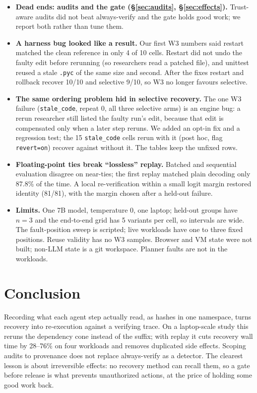 \documentclass[10pt,twocolumn,letterpaper]{article}
\begin{document}
\begin{itemize}
\item \textbf{Dead ends: audits and the gate (\S\ref{sec:audits}, \S\ref{sec:effects}).} Trust-aware audits did not beat always-verify and the gate holds good work; we report both rather than tune them.
\item \textbf{A harness bug looked like a result.} Our first W3 numbers said restart
  matched the clean reference in only 4 of 10 cells. Restart did not undo the faulty
  edit before rerunning (so researchers read a patched file), and unittest reused a
  stale \texttt{.pyc} of the same size and second. After the fixes restart and
  rollback recover 10/10 and selective 9/10, so W3 no longer favours selective.
\item \textbf{The same ordering problem hid in selective recovery.} The one W3
  failure (\texttt{stale\_code}, repeat 0, all three selective arms) is an engine
  bug: a rerun researcher still listed the faulty run's edit, because that edit is
  compensated only when a later step reruns. We added an opt-in fix and a regression
  test; the 15 \texttt{stale\_code} cells rerun with it (post hoc, flag
  \texttt{revert=on}) recover \vthreeStaleAfter{} against \vthreeStaleBefore{}
  without it. The tables keep the unfixed rows.
\item \textbf{Floating-point ties break ``lossless'' replay.} Batched and sequential
  evaluation disagree on near-ties; the first replay matched plain decoding only
  87.8\% of the time. A local re-verification within a small logit margin
  restored identity (81/81), with the margin chosen after a held-out failure.
\item \textbf{Limits.} One 7B model, temperature 0, one laptop; held-out groups have
  $n{=}3$ and the end-to-end grid has 5 variants per cell, so intervals are wide.
  The fault-position sweep is scripted; live workloads have one to three fixed
  positions. Reuse validity has no W3 samples. Browser and VM state were not built;
  non-LLM state is a git workspace. Planner faults are not in the workloads.
\end{itemize}

\section{Conclusion}
Recording what each agent step actually read, as hashes in one namespace, turns
recovery into re-execution against a verifying trace. On a laptop-scale study this
reruns the dependency cone instead of the suffix; with replay it cuts recovery wall
time by 28--76\% on four workloads and removes duplicated side effects. Scoping
audits to provenance does not replace always-verify as a detector. The clearest
lesson is about irreversible effects: no recovery method can recall them, so a
gate before release is what prevents unauthorized actions, at the price of holding
some good work back.

\ifdefined\vmeasure\else
{\footnotesize


}
\fi
\end{document}
